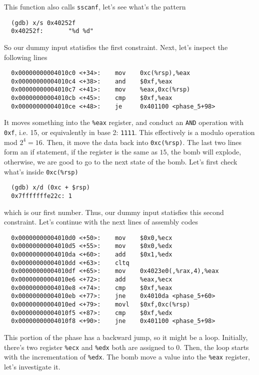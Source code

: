 This function also calls \verb+sscanf+, let's see what's the pattern
{\renewcommand\fcolorbox[4][]{\textcolor{cyan}{\strut#4}}
\begin{verbatim}
  (gdb) x/s 0x40252f
  0x40252f:       "%d %d"
\end{verbatim}
}\noindent
So our dummy input statisfies the first constraint. Next, let's inspect the following lines
{\renewcommand\fcolorbox[4][]{\textcolor{cyan}{\strut#4}}
\begin{verbatim}
  0x00000000004010c0 <+34>:    mov    0xc(%rsp),%eax
  0x00000000004010c4 <+38>:    and    $0xf,%eax
  0x00000000004010c7 <+41>:    mov    %eax,0xc(%rsp)
  0x00000000004010cb <+45>:    cmp    $0xf,%eax
  0x00000000004010ce <+48>:    je     0x401100 <phase_5+98>
\end{verbatim}
}\noindent
It moves something into the \verb+%eax+ register, and conduct an \verb+AND+ operation with \verb+0xf+, i.e. 15, or equivalently in base 2: \verb+1111+. This effectively is a modulo operation mod $2^4 = 16$. Then, it move the data back into \verb+0xc(%rsp)+. The last two lines form an if statement, if the register is the same as $15$, the bomb will explode, otherwise, we are good to go to the next state of the bomb. Let's first check what's inside \verb+0xc(%rsp)+
{\renewcommand\fcolorbox[4][]{\textcolor{cyan}{\strut#4}}
\begin{verbatim}
  (gdb) x/d (0xc + $rsp)
  0x7fffffffe22c: 1
\end{verbatim}
}\noindent
which is our first number. Thus, our dummy input statisfies this second constraint. Let's continue with the next lines of assembly codes
{\renewcommand\fcolorbox[4][]{\textcolor{cyan}{\strut#4}}
\begin{verbatim}
  0x00000000004010d0 <+50>:    mov    $0x0,%ecx
  0x00000000004010d5 <+55>:    mov    $0x0,%edx
  0x00000000004010da <+60>:    add    $0x1,%edx
  0x00000000004010dd <+63>:    cltq
  0x00000000004010df <+65>:    mov    0x4023e0(,%rax,4),%eax
  0x00000000004010e6 <+72>:    add    %eax,%ecx
  0x00000000004010e8 <+74>:    cmp    $0xf,%eax
  0x00000000004010eb <+77>:    jne    0x4010da <phase_5+60>
  0x00000000004010ed <+79>:    movl   $0xf,0xc(%rsp)
  0x00000000004010f5 <+87>:    cmp    $0xf,%edx
  0x00000000004010f8 <+90>:    jne    0x401100 <phase_5+98>
\end{verbatim}
}\noindent
This portion of the phase has a backward jump, so it might be a loop. Initially, there's two register \verb+%ecx+ and \verb+%edx+ both are assigned to $0$. Then, the loop starts with the incrementation of \verb+%edx+. The bomb move a value into the \verb+%eax+ register, let's investigate it.
